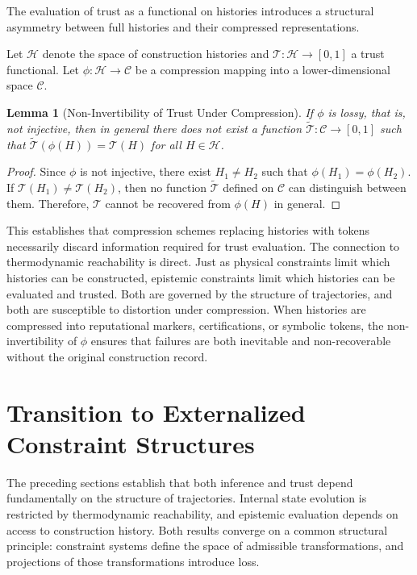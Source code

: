 \documentclass[12pt]{article}
\theoremstyle{plain}
\newtheorem{lemma}[theorem]{Lemma}
\theoremstyle{definition}
\theoremstyle{remark}
\begin{document}
The evaluation of trust as a functional on histories introduces a structural asymmetry between full histories and their compressed representations.

Let $\mathcal{H}$ denote the space of construction histories and $\mathcal{T} : \mathcal{H} \to [0,1]$ a trust functional. Let $\phi : \mathcal{H} \to \mathcal{C}$ be a compression mapping into a lower-dimensional space $\mathcal{C}$.

\begin{lemma}[Non-Invertibility of Trust Under Compression]
If $\phi$ is lossy, that is, not injective, then in general there does not exist a function $\tilde{\mathcal{T}} : \mathcal{C} \to [0,1]$ such that $\tilde{\mathcal{T}}(\phi(H)) = \mathcal{T}(H)$ for all $H \in \mathcal{H}$.
\end{lemma}

\begin{proof}
Since $\phi$ is not injective, there exist $H_1 \neq H_2$ such that $\phi(H_1) = \phi(H_2)$. If $\mathcal{T}(H_1) \neq \mathcal{T}(H_2)$, then no function $\tilde{\mathcal{T}}$ defined on $\mathcal{C}$ can distinguish between them. Therefore, $\mathcal{T}$ cannot be recovered from $\phi(H)$ in general.
\end{proof}

This establishes that compression schemes replacing histories with tokens necessarily discard information required for trust evaluation. The connection to thermodynamic reachability is direct. Just as physical constraints limit which histories can be constructed, epistemic constraints limit which histories can be evaluated and trusted. Both are governed by the structure of trajectories, and both are susceptible to distortion under compression. When histories are compressed into reputational markers, certifications, or symbolic tokens, the non-invertibility of $\phi$ ensures that failures are both inevitable and non-recoverable without the original construction record.

\section{Transition to Externalized Constraint Structures}

The preceding sections establish that both inference and trust depend fundamentally on the structure of trajectories. Internal state evolution is restricted by thermodynamic reachability, and epistemic evaluation depends on access to construction history. Both results converge on a common structural principle: constraint systems define the space of admissible transformations, and projections of those transformations introduce loss.
\end{document}
